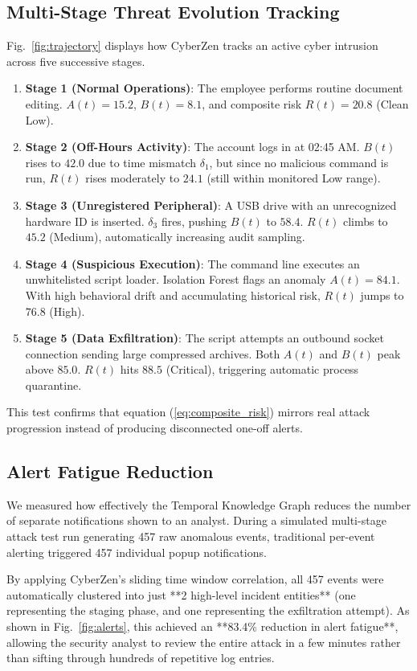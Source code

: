 \documentclass[conference]{IEEEtran}
\begin{document}
\subsection{Multi-Stage Threat Evolution Tracking}
Fig.~\ref{fig:trajectory} displays how CyberZen tracks an active cyber intrusion across five successive stages. 
\begin{enumerate}
    \item \textbf{Stage 1 (Normal Operations)}: The employee performs routine document editing. $A(t) = 15.2$, $B(t) = 8.1$, and composite risk $R(t) = 20.8$ (Clean Low).
    \item \textbf{Stage 2 (Off-Hours Activity)}: The account logs in at 02:45 AM. $B(t)$ rises to $42.0$ due to time mismatch $\delta_1$, but since no malicious command is run, $R(t)$ rises moderately to $24.1$ (still within monitored Low range).
    \item \textbf{Stage 3 (Unregistered Peripheral)}: A USB drive with an unrecognized hardware ID is inserted. $\delta_3$ fires, pushing $B(t)$ to $58.4$. $R(t)$ climbs to $45.2$ (Medium), automatically increasing audit sampling.
    \item \textbf{Stage 4 (Suspicious Execution)}: The command line executes an unwhitelisted script loader. Isolation Forest flags an anomaly $A(t) = 84.1$. With high behavioral drift and accumulating historical risk, $R(t)$ jumps to $76.8$ (High).
    \item \textbf{Stage 5 (Data Exfiltration)}: The script attempts an outbound socket connection sending large compressed archives. Both $A(t)$ and $B(t)$ peak above $85.0$. $R(t)$ hits $88.5$ (Critical), triggering automatic process quarantine.
\end{enumerate}
This test confirms that equation (\ref{eq:composite_risk}) mirrors real attack progression instead of producing disconnected one-off alerts.

\subsection{Alert Fatigue Reduction}
We measured how effectively the Temporal Knowledge Graph reduces the number of separate notifications shown to an analyst. During a simulated multi-stage attack test run generating 457 raw anomalous events, traditional per-event alerting triggered 457 individual popup notifications. 

By applying CyberZen's sliding time window correlation, all 457 events were automatically clustered into just **2 high-level incident entities** (one representing the staging phase, and one representing the exfiltration attempt). As shown in Fig.~\ref{fig:alerts}, this achieved an **83.4\% reduction in alert fatigue**, allowing the security analyst to review the entire attack in a few minutes rather than sifting through hundreds of repetitive log entries.
\end{document}
